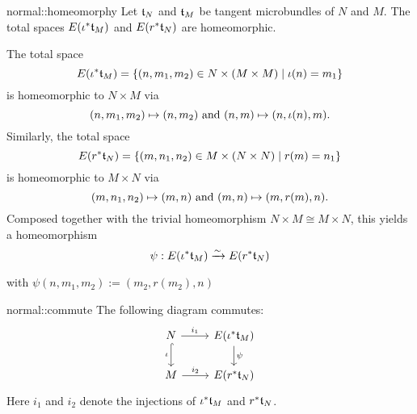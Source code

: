\begin{mylemma}{normal::homeomorphy}
    Let $\mathfrak{t}_N$ and $\mathfrak{t}_M$ be tangent microbundles of $N$ and $M$.
    The total spaces $E(\iota^*\mathfrak{t}_M)$ and $E(r^*\mathfrak{t}_N)$ are homeomorphic.
\end{mylemma}

\begin{myproof}
    The total space
    \[ E(\iota^*\mathfrak{t}_M) = \{ (n, m_1, m_2) \in N \times (M \times M) \mid \iota(n) = m_1\} \]
    is homeomorphic to $N \times M$ via
    \[ (n, m_1, m_2) \mapsto (n, m_2) \text{ and } (n, m) \mapsto (n, \iota(n), m). \]
    Similarly, the total space
    \[ E(r^*\mathfrak{t}_N) = \{ (m, n_1, n_2) \in M \times (N \times N) \mid r(m) = n_1\} \]
    is homeomorphic to $M \times N$ via
    \[ (m, n_1, n_2) \mapsto (m, n) \text{ and } (m, n) \mapsto (m, r(m), n). \]
    Composed together with the trivial homeomorphism $N \times M \cong M \times N$, this yields a homeomorphism
    \[ \psi: E(\iota^*\mathfrak{t}_M) \xrightarrow{\sim} E(r^*\mathfrak{t}_N) \]
    \begin{center}
        with $\psi(n, m_1, m_2) := (m_2, r(m_2), n)$
    \end{center}
\end{myproof}

\begin{myremark}{normal::commute}
    The following diagram commutes:
    \[
        \begin{tikzcd}
            N \ar[r, "i_1"] \ar[hookrightarrow, "\iota"']{d} & E(\ind{\iota}\bt_M) \ar[d, "\psi"] \\
            M \ar[r, "i_2"] & E(\ind{r}\bt_N)
        \end{tikzcd}
    \]
    Here $i_1$ and $i_2$ denote the injections of $\iota^*\mathfrak{t}_M$ and $r^*\mathfrak{t}_N$.
\end{myremark}
